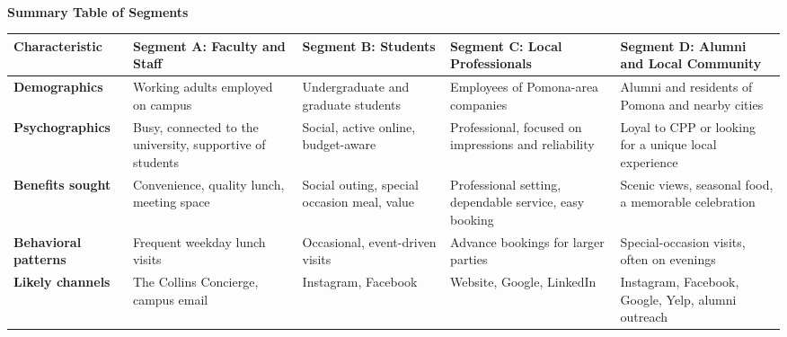 \documentclass[
  12pt,
  letterpaper,
  DIV=11,
  numbers=noendperiod]{scrartcl}
\makeatletter
\let\oldparagraph\paragraph
\renewcommand{\paragraph}{
    \@ifstar
      \xxxParagraphStar
      \xxxParagraphNoStar
  }
\newcommand{\xxxParagraphStar}[1]{\oldparagraph*{#1}\mbox{}}
\newcommand{\xxxParagraphNoStar}[1]{\oldparagraph{#1}\mbox{}}
\makeatother
\begin{document}
\paragraph{\texorpdfstring{\textbf{Summary Table of
Segments}}{Summary Table of Segments}}\label{summary-table-of-segments}

\begin{longtable}[]{@{}
  >{\raggedright\arraybackslash}p{}
  >{\raggedright\arraybackslash}p{}
  >{\raggedright\arraybackslash}p{}
  >{\raggedright\arraybackslash}p{}
  >{\raggedright\arraybackslash}p{}@{}}
\toprule\noalign{}
\begin{minipage}[b]{\linewidth}\raggedright
Characteristic
\end{minipage} & \begin{minipage}[b]{\linewidth}\raggedright
Segment A: Faculty and Staff
\end{minipage} & \begin{minipage}[b]{\linewidth}\raggedright
Segment B: Students
\end{minipage} & \begin{minipage}[b]{\linewidth}\raggedright
Segment C: Local Professionals
\end{minipage} & \begin{minipage}[b]{\linewidth}\raggedright
Segment D: Alumni and Local Community
\end{minipage} \\
\midrule\noalign{}
\endhead
\bottomrule\noalign{}
\endlastfoot
\textbf{Demographics} & Working adults employed on campus &
Undergraduate and graduate students & Employees of Pomona-area companies
& Alumni and residents of Pomona and nearby cities \\
\textbf{Psychographics} & Busy, connected to the university, supportive
of students & Social, active online, budget-aware & Professional,
focused on impressions and reliability & Loyal to CPP or looking for a
unique local experience \\
\textbf{Benefits sought} & Convenience, quality lunch, meeting space &
Social outing, special occasion meal, value & Professional setting,
dependable service, easy booking & Scenic views, seasonal food, a
memorable celebration \\
\textbf{Behavioral patterns} & Frequent weekday lunch visits &
Occasional, event-driven visits & Advance bookings for larger parties &
Special-occasion visits, often on evenings \\
\textbf{Likely channels} & The Collins Concierge, campus email &
Instagram, Facebook & Website, Google, LinkedIn & Instagram, Facebook,
Google, Yelp, alumni outreach \\
\end{longtable}
\end{document}
